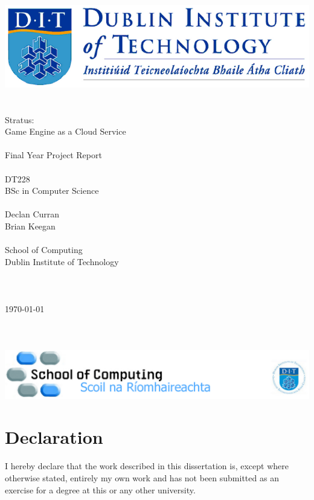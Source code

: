 \documentclass[a4paper, 12pt]{report}
\begin{document}
\begin{titlingpage}
	\centering
	\includegraphics[scale=0.5]{titleheader}\\
	~\\
	~\\
	\huge
	Stratus:\\
	Game Engine as a Cloud Service\\
	~\\
	Final Year Project Report\\
	~\\
	\LARGE
	DT228\\
	BSc in Computer Science\\
	~\\
	\large
	Declan Curran\\
	\normalsize
	Brian Keegan\\
	~\\
	School of Computing\\
	Dublin Institute of Technology\\
	~\\
	~\\
	~\\
	\today
	~\\
	~\\
	~\\
	~\\
	\includegraphics[scale=0.5]{titlefooter}
\end{titlingpage}


\chapter*{Declaration}
I hereby declare that the work described in this dissertation is, except where otherwise stated, entirely my own work and has not been submitted as an exercise for a degree at this or any other university.
\end{document}
